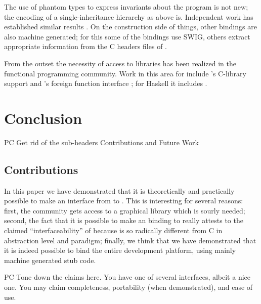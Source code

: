 \documentclass[workingdraft]{usetex-v1}
\begin{document}
The use of phantom types to express invariants about the program
is not new; the encoding of a single-inheritance hierarchy as
above is. Independent work has established similar results
\cite{Fluet-Pucella:2002}. %
On the construction side of things, other bindings are also machine
generated; for this some of the bindings use SWIG, others extract
appropriate information from the C headers files of \gtk.

From the outset the necessity of access to libraries has been realized
in the functional programming community. Work in this area for \sml
include \mosml's C-library support \cite{Larsen:2001} and 
\smlnj's foreign function interface \cite{Blume:2001:nlffi};
for Haskell it includes \cite{Finne:1999:CallingHellFromHeaven}.



\section{Conclusion}
\label{sec:conclusion}

\begin{ednote}{PC}
  Get rid of the sub-headers Contributions and Future Work

\end{ednote}


\subsection{Contributions}

In this paper we have demonstrated that it is theoretically and
practically possible to make an interface from \sml to \gtk.  This is
interesting for several reasons: first, the \sml community gets
access to a graphical library which is sourly needed; second, the fact
that it is possible to make an \sml binding to \gtk really attests to
the claimed ``interfaceability'' of \gtk because \sml is so radically
different from C in abstraction level and paradigm; finally, we think
that we have demonstrated that it is indeed possible to bind the entire \gnome
development platform, using mainly machine generated stub code.

\begin{ednote}{PC}
  Tone down the claims here.  You have one of several
interfaces, albeit a nice one.  You may claim completeness,
portability (when demonstrated), and ease of use.

\end{ednote}
\end{document}
